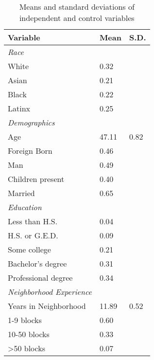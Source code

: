 % 
\begin{table}[ht]
\centering
\caption{Means and standard deviations of independent and control variables} 
\label{tab:descriptives}
\begin{tabular}{lp{.5in}p{.5in}}
  \toprule
Variable & Mean & S.D. \\ 
  \midrule
\emph{Race}&&\\White &  0.32 &  \\ 
  Asian &  0.21 &  \\ 
  Black &  0.22 &  \\ 
  Latinx &  0.25 &  \\ 
  \emph{Demographics}&&\\Age & 47.11 & 0.82 \\ 
  Foreign Born &  0.46 &  \\ 
  Man &  0.49 &  \\ 
  Children present &  0.40 &  \\ 
  Married &  0.65 &  \\ 
  \emph{Education}&&\\Less than H.S. &  0.04 &  \\ 
  H.S. or G.E.D. &  0.09 &  \\ 
  Some college &  0.21 &  \\ 
  Bachelor's degree &  0.31 &  \\ 
  Professional degree &  0.34 &  \\ 
  \emph{Neighborhood Experience}\\Years in Neighborhood & 11.89 & 0.52 \\ 
  1-9 blocks &  0.60 &  \\ 
  10-50 blocks &  0.33 &  \\ 
  >50 blocks &  0.07 &  \\ 
   \bottomrule
\end{tabular}
\end{table}

